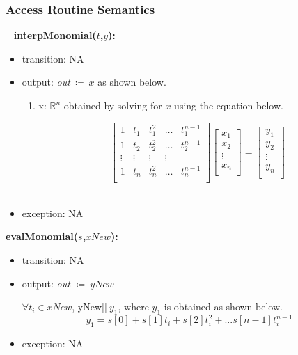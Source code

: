 \documentclass[12pt, titlepage]{article}
\begin{document}
\subsubsection{Access Routine Semantics}
~\newline
\noindent \textbf{interpMonomial($t$,$y$):}
\begin{itemize}
\item transition: NA

  
\item output: \textit{out}$\ \coloneqq\ x$ as shown below.

	\begin{enumerate}
		
		\item x: $\mathbb{R}^{n}$ obtained by solving for $x$ using 
		the 
		equation below.
		
		\begin{equation*}
		\begin{bmatrix}
		1 & t_{1} & t_{1} ^2 & \dots & t_{1} ^{n-1} \\
		1 & t_{2} & t_{2} ^2 & \dots & t_{2} ^{n-1} \\
		\vdots & \vdots & \vdots & \vdots \\
		1 & t_{n} & t_{n} ^2 & \dots & t_{n} ^{n-1} \\
		\end{bmatrix}
		\begin{bmatrix}
		x_1  \\
		x_2 \\
		\vdots \\
		x_n \\
		\end{bmatrix} = 
		\begin{bmatrix}
		y_1  \\
		y_2 \\
		\vdots \\
		y_n \\
		\end{bmatrix}
		\end{equation*}\\
	\end{enumerate}
 
\item exception: NA
\end{itemize}

\noindent \textbf{evalMonomial($s$,$xNew$):}
\begin{itemize}
	\item transition: NA
	
	\item output:  \textit{out} $\coloneqq\ yNew$
	
	$\forall t_i \in xNew$, yNew$\vert\vert\ y_1$, where $y_1$ is obtained as 
	shown 
	below.
	\begin{equation*}
	y_1 = s[0] + s[1] t_i + s[2] t_i ^2 + ... s[n-1] t_i ^{n-1}  
	\end{equation*}
	
	\item exception: NA
\end{itemize}
\end{document}
